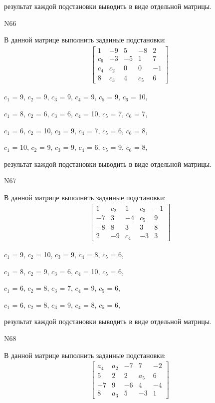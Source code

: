 \documentclass[11pt]{report}
\begin{document}
результат каждой подстановки выводить в виде отдельной матрицы.

N66

В данной матрице выполнить заданные подстановки:
\begin{align*}
\left[\begin{matrix}1 & -9 & 5 & -8 & 2\\c_{6} & -3 & -5 & 1 & 7\\c_{4} & c_{2} & 0 & 0 & -1\\8 & c_{3} & 4 & c_{5} & 6\end{matrix}\right]
\end{align*}


$c_{1}$ = 9, $c_{2}$ = 9, $c_{3}$ = 9, $c_{4}$ = 9, $c_{5}$ = 9, $c_{6}$ = 10, 

$c_{1}$ = 8, $c_{2}$ = 6, $c_{3}$ = 6, $c_{4}$ = 10, $c_{5}$ = 7, $c_{6}$ = 7, 

$c_{1}$ = 6, $c_{2}$ = 10, $c_{3}$ = 9, $c_{4}$ = 7, $c_{5}$ = 6, $c_{6}$ = 8, 

$c_{1}$ = 10, $c_{2}$ = 9, $c_{3}$ = 9, $c_{4}$ = 6, $c_{5}$ = 9, $c_{6}$ = 8, 

результат каждой подстановки выводить в виде отдельной матрицы.

N67

В данной матрице выполнить заданные подстановки:
\begin{align*}
\left[\begin{matrix}1 & c_{2} & 1 & c_{3} & -1\\-7 & 3 & -4 & c_{5} & 9\\-8 & 8 & 3 & 3 & 8\\2 & -9 & c_{4} & -3 & 3\end{matrix}\right]
\end{align*}


$c_{1}$ = 9, $c_{2}$ = 10, $c_{3}$ = 9, $c_{4}$ = 8, $c_{5}$ = 6, 

$c_{1}$ = 8, $c_{2}$ = 9, $c_{3}$ = 6, $c_{4}$ = 10, $c_{5}$ = 6, 

$c_{1}$ = 6, $c_{2}$ = 8, $c_{3}$ = 7, $c_{4}$ = 9, $c_{5}$ = 6, 

$c_{1}$ = 6, $c_{2}$ = 8, $c_{3}$ = 9, $c_{4}$ = 8, $c_{5}$ = 6, 

результат каждой подстановки выводить в виде отдельной матрицы.

N68

В данной матрице выполнить заданные подстановки:
\begin{align*}
\left[\begin{matrix}a_{4} & a_{2} & -7 & 7 & -2\\5 & 2 & 2 & a_{5} & 6\\-7 & 9 & -6 & 4 & -4\\8 & a_{3} & 5 & -3 & 1\end{matrix}\right]
\end{align*}
\end{document}
